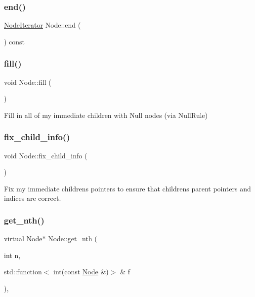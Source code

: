\subsubsection{\texorpdfstring{end()}{end()}}
{\footnotesize\ttfamily \hyperlink{class_node_1_1_node_iterator}{Node\+Iterator} Node\+::end (\begin{DoxyParamCaption}{ }\end{DoxyParamCaption}) const\hspace{0.3cm}{\ttfamily [inline]}}

\mbox{\label{class_node_a1c03973664fcfdfb191feb67f565168b}} 
\subsubsection{\texorpdfstring{fill()}{fill()}}
{\footnotesize\ttfamily void Node\+::fill (\begin{DoxyParamCaption}{ }\end{DoxyParamCaption})\hspace{0.3cm}{\ttfamily [inline]}}

Fill in all of my immediate children with Null nodes (via Null\+Rule)\mbox{\label{class_node_a8f25f44608c0b19fe02eaf19ade9ea68}} 
\subsubsection{\texorpdfstring{fix\+\_\+child\+\_\+info()}{fix\_child\_info()}}
{\footnotesize\ttfamily void Node\+::fix\+\_\+child\+\_\+info (\begin{DoxyParamCaption}{ }\end{DoxyParamCaption})\hspace{0.3cm}{\ttfamily [inline]}}

Fix my immediate children\textquotesingle{}s pointers to ensure that children\textquotesingle{}s parent pointers and indices are correct.\mbox{\label{class_node_a93fc84b584f080593978d3a39631d3e5}} 
\subsubsection{\texorpdfstring{get\+\_\+nth()}{get\_nth()}\hspace{0.1cm}{\footnotesize\ttfamily [1/2]}}
{\footnotesize\ttfamily virtual \hyperlink{class_node}{Node}$\ast$ Node\+::get\+\_\+nth (\begin{DoxyParamCaption}\item[{int}]{n,  }\item[{std\+::function$<$ int(const \hyperlink{class_node}{Node} \&)$>$ \&}]{f }\end{DoxyParamCaption})\hspace{0.3cm}{\ttfamily [inline]}, {\ttfamily [virtual]}}

